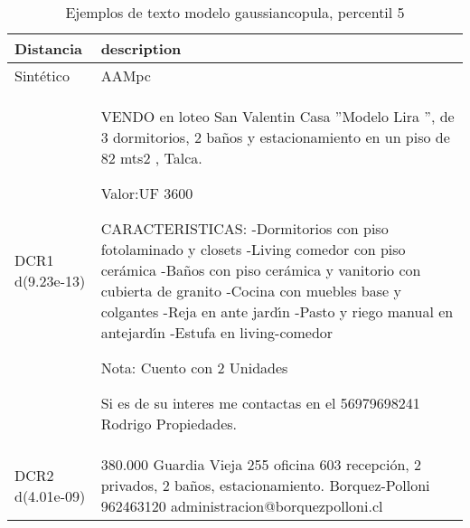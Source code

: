 \begin{table}[H]
\centering
\fontsize{10}{14}\selectfont
\caption{Ejemplos de texto modelo gaussiancopula, percentil 5}
\label{table-example-economicos-b-3-gaussiancopula-5p-text}
\begin{tabular}{|l|m{35em}|}
\hline
\rowcolor[gray]{0.8}
Distancia & description \\
\hline Sintético & AAMpc \\
\hline DCR1 d(9.23e-13) & VENDO en loteo San Valentin Casa ''Modelo Lira '', de 3 dormitorios, 2 ba\~nos y estacionamiento en un piso de 82 mts2 , Talca.

Valor:UF 3600

CARACTERISTICAS:
-Dormitorios con piso fotolaminado y closets
-Living comedor con piso cer\'amica
-Ba\~nos con piso cer\'amica y vanitorio con cubierta de granito
-Cocina con muebles base y colgantes
-Reja en ante jard{\'\i}n
-Pasto y riego manual en antejard{\'\i}n
-Estufa en living-comedor
 

Nota: Cuento con 2 Unidades

Si es de su interes me contactas en el 56979698241 Rodrigo Propiedades. \\
\hline DCR2 d(4.01e-09) & 380.000 Guardia Vieja 255 oficina 603 recepci\'on, 2 privados, 2 ba\~nos, estacionamiento. Borquez-Polloni 962463120 administracion@borquezpolloni.cl \\
\hline
\end{tabular}
\end{table}
